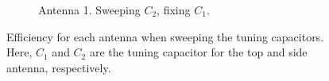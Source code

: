 \begin{figure}[htbp]
\begin{subfigure}{0.49\linewidth}
        \caption{Antenna 1. Sweeping $C_2$, fixing $C_1$.}
    \end{subfigure}
    \caption{Efficiency for each antenna when sweeping the tuning capacitors. Here, $C_1$ and $C_2$ are the tuning capacitor for the top and side antenna, respectively.}
    \label{fig:eff_sol2}
\end{figure}

